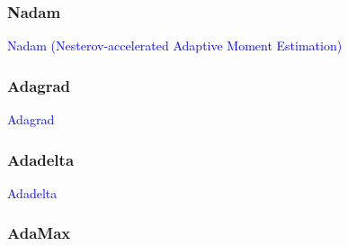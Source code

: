 \subsubsection{Nadam}

\textcolor{blue}{Nadam (Nesterov-accelerated Adaptive Moment Estimation)~\cite{dozat2016incorporating}}

\subsubsection{Adagrad}

\textcolor{blue}{Adagrad~\cite{duchi2011adaptive}}

\subsubsection{Adadelta}

\textcolor{blue}{Adadelta~\cite{zeiler2012adadelta}}

\subsubsection{AdaMax}




